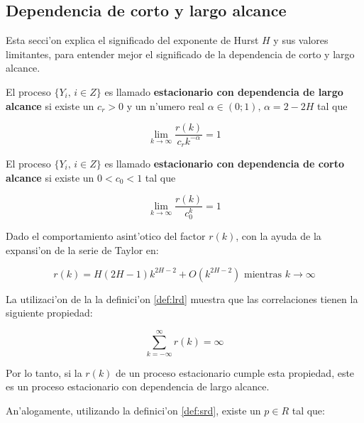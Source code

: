\subsection{Dependencia de corto y largo alcance} \label{subsect:lsrd}

Esta secci'on explica el significado del exponente de Hurst $H$ y sus valores
limitantes, para entender mejor el significado de la dependencia de corto y
largo alcance.

\begin{definicion} \label{def:lrd}
El proceso $\{Y_i \text{,  } i \in Z \}$ es llamado {\bf estacionario con
dependencia de largo alcance} si existe un $c_r > 0$ y un n'umero real
$\alpha \in (0;1) \text{,  } \alpha = 2 - 2H$ tal que

\begin{equation} \label{eq:lrd}
\lim_{k \to \infty} \frac{r(k)}{c_rk^{-\alpha}} = 1
\end{equation}
\end{definicion}

\begin{definicion} \label{def:srd}
El proceso $\{Y_i \text{,  } i \in Z \}$ es llamado {\bf estacionario con
dependencia de corto alcance} si existe un $0 < c_0 < 1$ tal que

\begin{equation} \label{eq:srd}
\lim_{k \to \infty} \frac{r(k)}{c_0^k} = 1
\end{equation}
\end{definicion}

Dado el comportamiento asint'otico del factor $r(k)$, con la ayuda de la
expansi'on de la serie de Taylor en:

\begin{equation}
r(k) = H (2H-1)k^{2H-2} + O(k^{2H-2}) \text{ mientras  } k \to \infty
\end{equation}

La utilizaci'on de la la definici'on \ref{def:lrd} muestra que las
correlaciones tienen la siguiente propiedad:

\begin{equation}
\sum_{k = -\infty}^{\infty}{r(k)} = \infty
\end{equation}

Por lo tanto, si la $r(k)$ de un proceso estacionario cumple esta propiedad,
este es un proceso estacionario con dependencia de largo alcance.

An'alogamente, utilizando la definici'on \ref{def:srd}, existe un $p \in R$
tal que:

